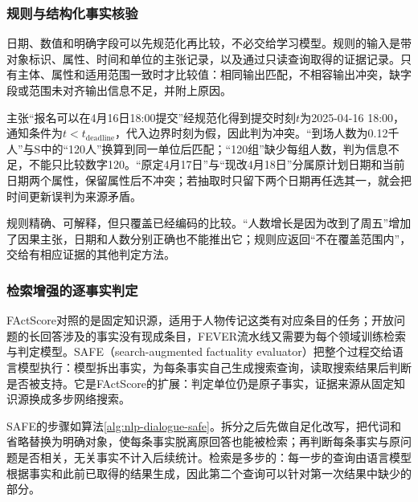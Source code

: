 \subsubsection{规则与结构化事实核验}
\label{sec:nlp-dialogue-structured-check}

日期、数值和明确字段可以先规范化再比较，不必交给学习模型。规则的输入是带对象标识、属性、时间和单位的主张记录，以及通过只读查询取得的证据记录。只有主体、属性和适用范围一致时才比较值：相同输出匹配，不相容输出冲突，缺字段或范围未对齐输出信息不足，并附上原因。

主张“报名可以在4月16日18:00提交”经规范化得到提交时刻$t$为2025-04-16 18:00，通知条件为$t<t_{\mathrm{deadline}}$，代入边界时刻为假，因此判为冲突。“到场人数为0.12千人”与S中的“120人”换算到同一单位后匹配；“120组”缺少每组人数，判为信息不足，不能只比较数字120。“原定4月17日”与“现改4月18日”分属原计划日期和当前日期两个属性，保留属性后不冲突；若抽取时只留下两个日期再任选其一，就会把时间更新误判为来源矛盾。

规则精确、可解释，但只覆盖已经编码的比较。“人数增长是因为改到了周五”增加了因果主张，日期和人数分别正确也不能推出它；规则应返回“不在覆盖范围内”，交给有相应证据的其他判定方法。

\subsubsection{检索增强的逐事实判定}
\label{sec:nlp-dialogue-safe}

FActScore对照的是固定知识源，适用于人物传记这类有对应条目的任务；开放问题的长回答涉及的事实没有现成条目，FEVER流水线又需要为每个领域训练检索与判定模型。SAFE（search-augmented factuality evaluator）把整个过程交给语言模型执行：模型拆出事实，为每条事实自己生成搜索查询，读取搜索结果后判断是否被支持。它是FActScore的扩展：判定单位仍是原子事实，证据来源从固定知识源换成多步网络搜索。

SAFE的步骤如算法\ref{alg:nlp-dialogue-safe}。拆分之后先做自足化改写，把代词和省略替换为明确对象，使每条事实脱离原回答也能被检索；再判断每条事实与原问题是否相关，无关事实不计入后续统计。检索是多步的：每一步的查询由语言模型根据事实和此前已取得的结果生成，因此第二个查询可以针对第一次结果中缺少的部分。

